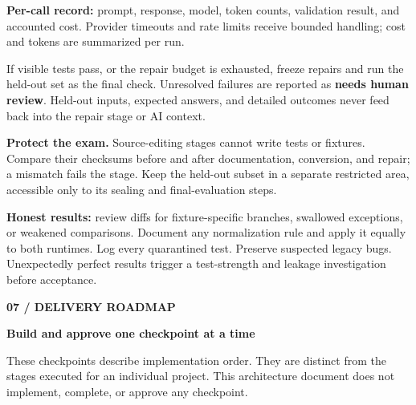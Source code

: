 \documentclass[11pt,a4paper]{article}
\newcommand{\pageheading}[2]{%
  {\small\color{blue}\sffamily\bfseries #1}\par
  {\LARGE\color{ink}\sffamily\bfseries #2}\par\vspace{3mm}}
\newcommand{\callout}[2]{%
  \par\noindent\colorbox{#1}{%
    \parbox{\dimexpr\linewidth-2\fboxsep\relax}{\strut #2\strut}}\par}
\newcommand{\smalltitle}[1]{\par\medskip{\large\sffamily\bfseries\color{ink}#1}\par}
\begin{document}
\textbf{Per-call record:} prompt, response, model, token counts, validation result,
and accounted cost. Provider timeouts and rate limits receive bounded handling;
cost and tokens are summarized per run.

\smalltitle{The repair loop}
\begin{center}
\end{center}

If visible tests pass, or the repair budget is exhausted, freeze repairs and run
the held-out set as the final check. Unresolved failures are reported as
\textbf{needs human review}. Held-out inputs, expected answers, and detailed
outcomes never feed back into the repair stage or AI context.

\callout{greenwash}{\textbf{Protect the exam.}
Source-editing stages cannot write tests or fixtures. Compare their checksums
before and after documentation, conversion, and repair; a mismatch fails the
stage. Keep the held-out subset in a separate restricted area, accessible only
to its sealing and final-evaluation steps.}

\textbf{Honest results:} review diffs for fixture-specific branches, swallowed
exceptions, or weakened comparisons. Document any normalization rule and apply
it equally to both runtimes. Log every quarantined test. Preserve suspected
legacy bugs. Unexpectedly perfect results trigger a test-strength and leakage
investigation before acceptance.

\newpage
\pageheading{07 / DELIVERY ROADMAP}{Build and approve one checkpoint at a time}

These checkpoints describe implementation order. They are distinct from the
stages executed for an individual project. This architecture document does not
implement, complete, or approve any checkpoint.
\end{document}
